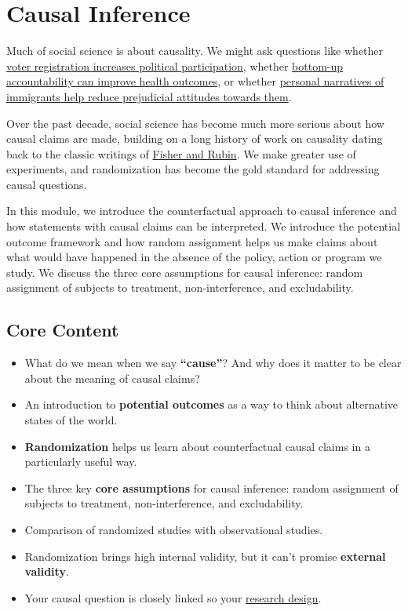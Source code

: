 \documentclass[12pt,]{book}
\begin{document}
\hypertarget{causal-inference}{%
\chapter{Causal Inference}\label{causal-inference}}

Much of social science is about causality. We might ask questions like whether \href{https://egap.org/resource/electoral-administration-in-kenya/}{voter registration increases political participation}, whether \href{https://egap.org/resource/does-bottom-up-accountability-work-evidence-from-uganda/}{bottom-up accountability can improve health outcomes}, or whether \href{https://egap.org/resource/brief-70-how-personal-narratives-reduce-negative-attitudes-towards-immigrants-in-kenya/}{personal narratives of immigrants help reduce prejudicial attitudes towards them}.

Over the past decade, social science has become much more serious about how causal claims are made, building on a long history of work on causality dating back to the classic writings of \protect\hyperlink{causalinference-classics}{Fisher and Rubin}. We make greater use of experiments, and randomization has become the gold standard for addressing causal questions.

In this module, we introduce the counterfactual approach to causal inference and how statements with causal claims can be interpreted. We introduce the potential outcome framework and how random assignment helps us make claims about what would have happened in the absence of the policy, action or program we study. We discuss the three core assumptions for causal inference: random assignment of subjects to treatment, non-interference, and excludability.

\hypertarget{core-content-1}{%
\section{Core Content}\label{core-content-1}}

\begin{itemize}
\item
  What do we mean when we say \textbf{``cause''}? And why does it matter to be clear about the meaning of causal claims?
\item
  An introduction to \textbf{potential outcomes} as a way to think about alternative states of the world.
\item
  \textbf{Randomization} helps us learn about counterfactual causal claims in a particularly useful way.
\item
  The three key \textbf{core assumptions} for causal inference: random assignment of subjects to treatment, non-interference, and excludability.
\item
  Comparison of randomized studies with observational studies.
\item
  Randomization brings high internal validity, but it can't promise \textbf{external validity}.
\item
  Your causal question is closely linked so your \href{the-research-design-process.html}{research design}.
\end{itemize}
\end{document}
